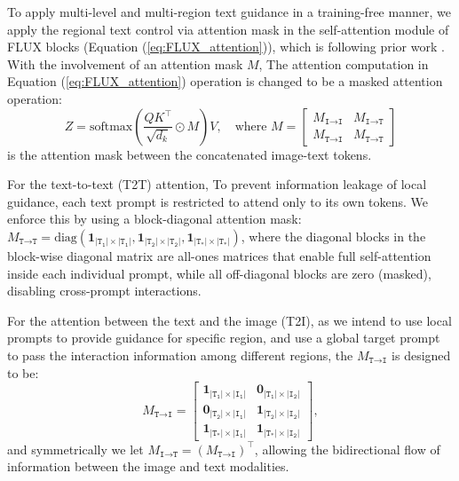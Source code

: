 \documentclass{article}
\begin{document}
To apply multi-level and multi-region text guidance in a training-free manner, we apply the regional text control via attention mask in  the self-attention module of FLUX blocks (Equation (\ref{eq:FLUX_attention})), which is following prior work \citep{chen2024training}. With the involvement of an attention mask $M$, The attention computation in Equation (\ref{eq:FLUX_attention}) operation is changed to be a masked attention operation:
\begin{equation}
Z = \mathrm{softmax}\left(\frac{QK^\top}{\sqrt{d_k}} \odot M\right)V, \quad\text{where }M = \begin{bmatrix}
        M_{\texttt{I}\to\texttt{I}} &  M_{\texttt{I}\to\texttt{T}} \\
        M_{\texttt{T}\to\texttt{I}} &  M_{\texttt{T}\to\texttt{T}}
    \end{bmatrix}
\label{eq:masked_attention}
\end{equation}
is the attention mask between the concatenated image-text tokens.
    
For the text-to-text (T2T) attention, To prevent information leakage of local guidance, each text prompt is restricted to attend only to its own tokens. We enforce this by using a block-diagonal attention mask: $M_{\texttt{T}\to\texttt{T}}=\mathrm{diag}(\mathbf{1}_{|\texttt{T}_\texttt{1}| \times |\texttt{T}_\texttt{1}|}, \mathbf{1}_{|\texttt{T}_\texttt{2}| \times |\texttt{T}_\texttt{2}|},\mathbf{1}_{|\texttt{T}_\texttt{*}| \times|\texttt{T}_\texttt{*}|})$, where the diagonal blocks  in the block-wise diagonal matrix are all-ones matrices that enable full self-attention inside each individual prompt, while all off-diagonal blocks are zero (masked), disabling cross-prompt interactions.


For the attention between the text and the image (T2I), as we intend to use local prompts to provide guidance for specific region, and use a global target prompt to pass the interaction information among different regions, the $M_{\texttt{T}\to\texttt{I}}$ is designed to be:
\begin{equation}
    M_{\texttt{T}\to\texttt{I}} = \begin{bmatrix}
        \mathbf{1}_{|\texttt{T}_\texttt{1}|\times|\texttt{I}_\texttt{1}|} &  \mathbf{0}_{|\texttt{T}_\texttt{1}|\times|\texttt{I}_\texttt{2}|}\\
        \mathbf{0}_{|\texttt{T}_\texttt{2}|\times|\texttt{I}_\texttt{1}|} &  \mathbf{1}_{|\texttt{T}_\texttt{2}|\times|\texttt{I}_\texttt{2}|}\\
         \mathbf{1}_{|\texttt{T}_\texttt{*}|\times|\texttt{I}_\texttt{1}|} &  \mathbf{1}_{|\texttt{T}_\texttt{*}|\times|\texttt{I}_\texttt{2}|}
    \end{bmatrix},
\end{equation}
and symmetrically we let $M_{\texttt{I}\to\texttt{T}}=(M_{\texttt{T}\to\texttt{I}})^\top$, allowing the bidirectional flow of information between the image and text modalities.
\end{document}
